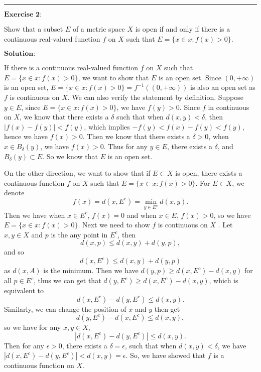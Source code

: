 \documentclass[12pt]{article}
\begin{document}
\noindent\rule[0.25\baselineskip]{\textwidth}{0.5pt}

\vspace{8pt}
$\textbf{Exercise 2:}$

Show that a subset $E$ of a metric space $X$ is open if and only if there is a continuous real-valued function $f$ on $X$ such that $E = \{x \in x : f(x) > 0 \}$.
 
\vspace{8pt}
$\textbf{Solution:}$

If there is a continuous real-valued function $f$ on $X$ such that $E = \{x \in x : f(x) > 0 \}$, we want to show that $E$ is an open set. Since $(0, + \infty)$ is an open set, $E = \{x \in x : f(x) > 0 \} = f^{-1} ((0, + \infty))$ is also an open set as $f$ is continuous on $X$. We can also verify the statement by definition. Suppose $y \in E$, since $E = \{x \in x : f(x) > 0 \}$, we have $f(y) > 0$. Since $f$ in continuous on $X$, we know that there exists a $\delta$ such that when $d(x,y) < \delta$, then $|f(x) - f(y)| < f(y)$, which implies $- f(y) < f(x) - f(y) < f(y)$, hence we have $f(x) > 0$. Then we know that there exists a $\delta > 0$, when $x \in B_{\delta} (y)$, we have $f(x) > 0$. Thus for any $y \in E$, there exists a $\delta$, and $B_{\delta} (y) \subset E$. So we know that $E$ is an open set.

On the other direction, we want to show that if $E \subset X$ is open, there exists a continuous function $f$ on $X$ such that $E = \{x \in x : f(x) > 0 \}$. For $E \in X$, we denote
\begin{equation*}
    f(x) = d(x, E^{c}) = \min_{y \in E^{c}} d(x, y).
\end{equation*}
Then we have when $x \in E^{c}$, $f(x) = 0$ and when $x \in E$, $f(x) > 0$, so we have $E = \{x \in x : f(x) > 0 \}$. Next we need to show $f$ is continuous on $X$ . Let $x, y \in X$ and $p$ is the any point in $E^{c}$, then
\begin{equation*}
    d(x, p) \leq d(x, y) + d(y, p),
\end{equation*}
and so
\begin{equation*}
    d(x, E^{c}) \leq d(x, y) + d(y, p)
\end{equation*}
as $d(x, A)$ is the minimum. Then we have $d(y, p) \geq d(x, E^{c}) - d(x, y)$ for all $p \in E^{c}$, thus we can get that $d(y, E^{c}) \geq d(x, E^{c}) - d(x, y)$, which is equivalent to
\begin{equation*}
    d(x, E^{c}) - d(y, E^{c}) \leq d(x, y).
\end{equation*}
Similarly, we can change the position of $x$ and $y$ then get
\begin{equation*}
    d(y, E^{c}) - d(x, E^{c}) \leq d(x, y),
\end{equation*}
so we have for any $x, y \in X$,
\begin{equation*}
    | d(x, E^{c}) - d(y, E^{c})| \leq d(x, y).
\end{equation*}
Then for any $\epsilon > 0$, there exists a $\delta = \epsilon$, such that when $d(x, y) < \delta$, we have $|d(x, E^{c}) - d(y, E^{c})| < d(x, y) = \epsilon$. So, we have showed that $f$ is a continuous function on $X$.
\end{document}
